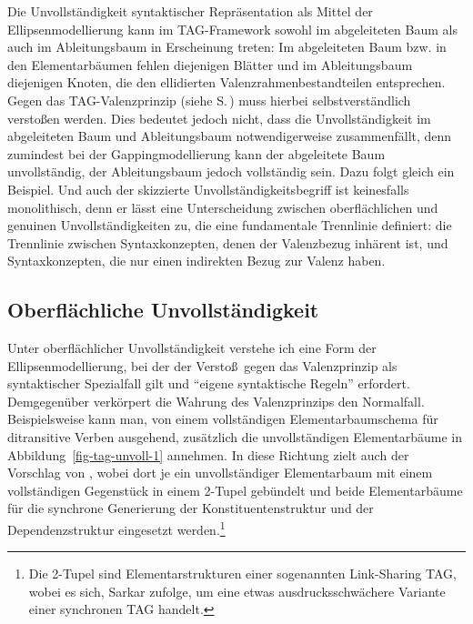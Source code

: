 Die Unvollständigkeit syntaktischer Repräsentation als Mittel der Ellipsenmodellierung kann im TAG-Framework sowohl im abgeleiteten Baum als auch im Ableitungsbaum in Erscheinung treten: Im abgeleiteten Baum bzw. in den Elementarbäumen fehlen diejenigen Blätter und im Ableitungsbaum diejenigen Knoten, die den ellidierten Valenzrahmenbestandteilen entsprechen. Gegen das TAG-Valenzprinzip (siehe S.\,\pageref{ex-valenzprinzip-tag}) muss hierbei selbstverständlich versto\ss en werden. Dies bedeutet jedoch nicht, dass die Unvollständigkeit im abgeleiteten Baum und Ableitungsbaum notwendigerweise zusammenfällt, denn zumindest bei der Gappingmodellierung kann der abgeleitete Baum unvollständig, der Ableitungsbaum jedoch vollständig sein. Dazu folgt gleich ein Beispiel. Und auch der skizzierte  Unvollständigkeitsbegriff ist keinesfalls monolithisch, denn er lässt eine Unterscheidung zwischen oberflächlichen und genuinen Unvollständigkeiten zu, die eine fundamentale Trennlinie definiert: die Trennlinie zwischen Syntaxkonzepten, denen der Valenzbezug inhärent ist, und Syntaxkonzepten, die nur einen indirekten Bezug zur Valenz haben.


\subsection{Oberflächliche Unvollständigkeit}

Unter oberflächlicher Unvollständigkeit verstehe ich eine Form der Ellipsenmodellierung, bei der der Versto\ss\ gegen das Valenzprinzip als syntaktischer Spezialfall gilt und "`eigene syntaktische Regeln"' \citep{Klein:93} erfordert. Demgegenüber verkörpert die Wahrung des Valenzprinzips den Normalfall. Beispielsweise kann man, von einem vollständigen Elementarbaumschema für ditransitive Verben ausgehend, zusätzlich die unvollständigen Elementarbäume in Abbildung~\ref{fig-tag-unvoll-1} annehmen. In diese Richtung zielt auch der Vorschlag von \cite{Sarkar:97}, wobei dort je ein unvollständiger Elementarbaum mit einem vollständigen Gegenstück in einem 2-Tupel gebündelt und beide Elementarbäume für die synchrone Generierung der Konstituentenstruktur und der Dependenzstruktur eingesetzt werden.\footnote{Die 2-Tupel sind Elementarstrukturen einer sogenannten Link-Sharing TAG, wobei es sich, Sarkar zufolge, um eine etwas ausdrucksschwächere Variante einer synchronen TAG \citep{Shieber:Schabes:90} handelt.} 

